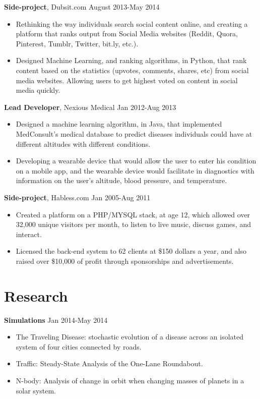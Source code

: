 \documentclass[margin]{res}
\begin{document}
\begin{resume}
{\bf Side-project}, Dubsit.com \hfill August 2013-May 2014
\begin{itemize} \itemsep -2pt 
\item Rethinking the way individuals search social content online, and creating a platform that ranks output from Social Media websites (Reddit, Quora, Pinterest, Tumblr, Twitter, bit.ly, etc.).
\item Designed Machine Learning, and ranking algorithms, in Python, that rank content based on the statistics (upvotes, comments, shares, etc) from social media websites. Allowing users to get highest voted on content in social media quickly.
\end{itemize}

 {\bf Lead Developer}, Nexious Medical \hfill Jan 2012-Aug 2013
 \begin{itemize} \itemsep -2pt
 \item Designed a machine learning algorithm, in Java, that implemented MedConsult's medical database to predict diseases individuals could have at different altitudes with different conditions.
 \item Developing a wearable device that would allow the user to enter his condition on a mobile app, and the wearable device would facilitate in diagnostics with information on the user's altitude, blood pressure, and temperature.
 \end{itemize}

{\bf Side-project}, Habless.com \hfill Jan 2005-Aug 2011
\begin{itemize} \itemsep -2pt 
\item Created a platform on a PHP/MYSQL stack, at age 12, which allowed over 32,000
unique visitors per month, to listen to live music, discuss games, and interact.
\item Licensed the back-end system to 62 clients at \$150 dollars a year, and also raised over \$10,000 of profit through sponsorships and advertisements.
\end{itemize}

\section{Research}

{\bf Simulations} \hfill Jan 2014-May 2014
\begin{itemize} \itemsep -2pt 
\item The Traveling Disease: stochastic evolution of a disease across an isolated system of four cities connected by roads.
\item Traffic: Steady-State Analysis of the One-Lane Roundabout.
\item N-body: Analysis of change in orbit when changing masses of planets in a solar system.
\end{itemize}


\end{resume}
\end{document}
